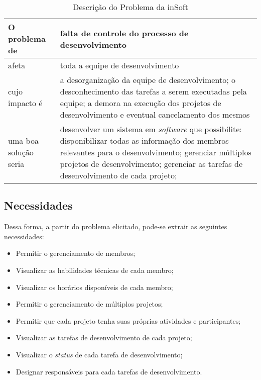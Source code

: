       \begin{table}[H]
        \centering
        \begin{tabular}{|>{\columncolor[HTML]{C0C0C0}}p{}|p{}|}
          \hline
          O problema de         &   falta de controle do processo de desenvolvimento \\ \hline
          afeta                 &   toda a equipe de desenvolvimento                 \\ \hline
          cujo impacto é        &   a desorganização da equipe de desenvolvimento;
                                    o desconhecimento das tarefas a serem executadas pela equipe;
                                    a demora na execução dos projetos de desenvolvimento e eventual cancelamento dos mesmos                                         \\ \hline
          uma boa solução seria &   desenvolver um sistema em \emph{software} que possibilite:
                                    disponibilizar todas as informação dos membros relevantes para o desenvolvimento;
                                    gerenciar múltiplos projetos de desenvolvimento;
                                    gerenciar as tarefas de desenvolvimento de cada projeto;
                                    \\ \hline
        \end{tabular}
        \caption{Descrição do Problema da inSoft}
      \end{table}

    \subsection{Necessidades}

      Dessa forma, a partir do problema elicitado, pode-se extrair as seguintes necessidades:

        \begin{itemize}
          \item Permitir o gerenciamento de membros;
          \item Visualizar as habilidades técnicas de cada membro;
          \item Visualizar os horários disponíveis de cada membro;
          \item Permitir o gerenciamento de múltiplos projetos;
          \item Permitir que cada projeto tenha suas próprias atividades e participantes;
          \item Visualizar as tarefas de desenvolvimento de cada projeto;
          \item Visualizar o \emph{status} de cada tarefa de desenvolvimento;
          \item Designar responsáveis para cada tarefas de desenvolvimento.
        \end{itemize}

